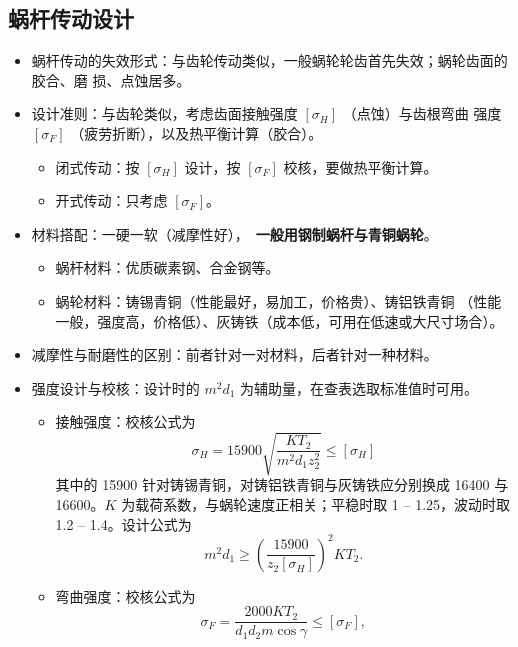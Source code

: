 \documentclass[12pt,a4paper]{article}
\newcommand{\tightlist}{\setlength{\parskip}{0pt}\setlength{\itemsep}{0pt}}
\newcommand{\hint}[1]{\textsf{（#1）}}
\newcommand{\minor}[1]{{\color{gray} #1}}
\renewcommand{\emph}[1]{\faIcon[regular]{lightbulb}\ \textbf{#1}}
\begin{document}
\subsection{蜗杆传动设计}
\begin{itemize}\tightlist
    \item 蜗杆传动的失效形式：与齿轮传动类似，一般蜗轮轮齿首先失效；蜗轮齿面的胶合、磨
    损、点蚀居多。
    \item 设计准则：与齿轮类似，考虑齿面接触强度 $[\sigma_H]$ \hint{点蚀}与齿根弯曲
    强度 $[\sigma_F]$ \hint{疲劳折断}，以及热平衡计算\hint{胶合}。
    \begin{itemize}\tightlist
        \item 闭式传动：按 $[\sigma_H]$ 设计，按 $[\sigma_F]$ 校核，要做热平衡计算。
        \item 开式传动：只考虑 $[\sigma_F]$。
    \end{itemize}
    \item 材料搭配：一硬一软\hint{减摩性好}，\emph{一般用钢制蜗杆与青铜蜗轮}。
    \begin{itemize}\tightlist
        \item \minor{蜗杆材料：优质碳素钢、合金钢等。}
        \item \minor{蜗轮材料：铸锡青铜\hint{性能最好，易加工，价格贵}、铸铝铁青铜
        \hint{性能一般，强度高，价格低}、灰铸铁\hint{成本低，可用在低速或大尺寸场合}。}
    \end{itemize}
    \item 减摩性与耐磨性的区别：前者针对一对材料，后者针对一种材料。
    \item 强度设计与校核：设计时的 $m^2d_1$ 为辅助量，在查表选取标准值时可用。
    \begin{itemize}\tightlist
        \item 接触强度：校核公式为
        \begin{equation}
        \sigma_H=15900\sqrt{\frac{KT_2}{m^2d_1z_2^2}}\leq[\sigma_H]
        \end{equation}
        \minor{其中的 15900 针对铸锡青铜，对铸铝铁青铜与灰铸铁应分别换成 16400 与
        16600。}$K$ 为载荷系数，与蜗轮速度正相关；平稳时取 1 -- 1.25，波动时取 1.2
        -- 1.4。设计公式为
        \begin{equation}
        m^2d_1\geq\left(\frac{15900}{z_2[\sigma_H]}\right)^2KT_2.
        \end{equation}
        \item 弯曲强度：校核公式为
        \begin{equation}
        \sigma_F=\frac{2000KT_2}{d_1d_2m\cos\gamma}\leq[\sigma_F],

\end{equation}
\end{itemize}
\end{itemize}
\end{document}
